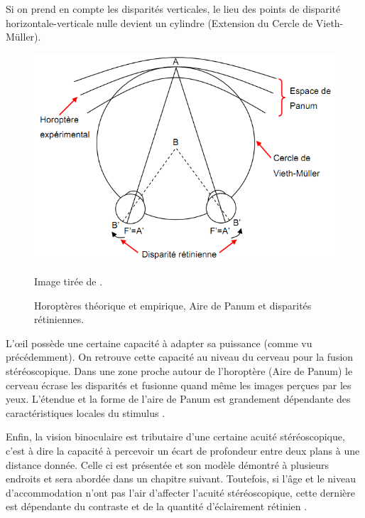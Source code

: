 	\par Si on prend en compte les disparités verticales, le lieu des points de disparité horizontale-verticale nulle devient un cylindre (Extension du Cercle de Vieth-Müller).
	
	\begin{figure}
		\centering
		\includegraphics[scale=.55]{Figures/HoropterePanum}
		\caption{Horoptères théorique et empirique, Aire de Panum et disparités rétiniennes.}{Image tirée de \citep{neveu_impact_2012}.}
		\label{fig:horoptere_panum}
	\end{figure}
	
	\par L'œil possède une certaine capacité à adapter sa puissance (comme vu précédemment). On retrouve cette capacité au niveau du cerveau pour la fusion stéréoscopique. Dans une zone proche autour de l'horoptère (Aire de Panum) le cerveau écrase les disparités et fusionne quand même les images perçues par les yeux. L'étendue et la forme de l'aire de Panum est grandement dépendante des caractéristiques locales du stimulus \citep{devisme_optimisation_2004}.
	
	\par Enfin, la vision binoculaire est tributaire d'une certaine acuité stéréoscopique, c'est à dire la capacité à percevoir un écart de profondeur entre deux plans à une distance donnée. Celle ci est présentée et son modèle démontré à plusieurs endroits \citep{fuchs_traite_2003, gross_human_2008} et sera abordée dans un chapitre suivant. Toutefois, si l'âge et le niveau d'accommodation n'ont pas l'air d'affecter l'acuité stéréoscopique, cette dernière est dépendante du contraste et de la quantité d'éclairement rétinien \citep{devisme_optimisation_2004}.
	
